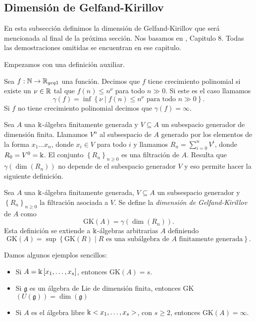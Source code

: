 \documentclass[a4paper,oneside,fleqn,11pt,../tesis.tex]{subfiles}
\begin{document}
\subsection{Dimensión de Gelfand-Kirillov}
En esta subsección definimos la dimensión de Gelfand-Kirillov que será mencionada al final de la próxima sección.
Nos basamos en \myworries{[NNR]}, Capitulo 8. Todas las demostraciones omitidas se encuentran en ese capitulo.

Empezamos con una definición auxiliar.
\begin{definition}
	Sea $f:\mathbb{N} \to \mathbb{R}_{geq 1}$ una función. Decimos que $f$ tiene crecimiento polinomial si existe un $\nu \in \mathbb{R}$
	tal que $f(n) \leq n^{\nu}$ para todo $n \gg 0$. Si este es el caso llamamos
	\[		
		\gamma(f) = \inf \left\lbrace \nu \mid f(n) \leq n^{\nu} \text{ para todo } n \gg 0  \right\rbrace.
	\]
	Si $f$ no tiene crecimiento polinomial decimos que $\gamma(f) = \infty$.
\end{definition}

Sea $A$ una $\Bbbk$-álgebra finitamente generada y $V \subseteq A$ un subespacio generador de dimensión finita.
Llamamos $V^n$ al subsespacio de $A$ generado por los elementos de la forma $x_{1} \ldots x_n$, donde $x_i \in V$ para todo $i$
y llamamos $R_n = \sum_{i = 0}^n V^i$, donde $R_0 = V^0 = \Bbbk$. El conjunto $\left\lbrace R_n \right\rbrace_{n \geq 0}$ es una
filtración de $A$. Resulta que $\gamma(\dim(R_n))$ no depende de el subespacio generador $V$ y eso permite hacer la siguiente definición.

\begin{definition}
	Sea $A$ una $\Bbbk$-álgebra finitamente generada, $V \subseteq A$ un subsespacio generador y $\left\lbrace R_n \right\rbrace_{n \geq 0}$
	la filtración asociada a $V$. Se define la \emph{dimensión de Gelfand-Kirillov} de $A$ como
	\[
		\text{GK}(A) = \gamma(\dim(R_n)).	
	\]
	Esta definición se extiende a $\Bbbk$-álgebras arbitrarias $A$ definiendo
	\[
		\text{GK}(A) = \sup\left\lbrace \text{GK}(R) \mid R \text{ es una subálgebra de }A\text{ finitamente generada} \right\rbrace.
	\]
\end{definition}

\begin{example}	Damos algunos ejemplos sencillos:
	\begin{itemize}		
		\item Si $A = \Bbbk\left[x_1, \ldots, x_s\right]$, entonces GK$(A) = s$.
		\item Si $\mathfrak{g}$ es un álgebra de Lie de dimensión finita, entonces GK$(U(\mathfrak{g})) = \dim(\mathfrak{g})$
		\item Si $A$ es el álgebra libre $\Bbbk <x_1, \ldots, x_s>$, con $s \geq 2$, entonces GK$(A) = \infty$.
	\end{itemize}
\end{example}
\end{document}
